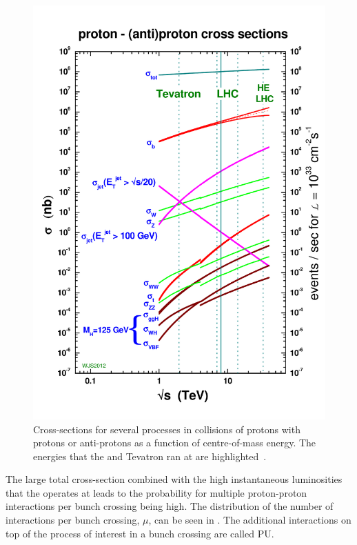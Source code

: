 \begin{figure}
  \includegraphics[width=1.2\largefigwidth]{plots/detector/crosssections2012HE_v4.pdf}
  \caption[Cross-sections for several processes in collisions of protons with protons or anti-protons as a function of centre-of-mass energy. The energies that the \LHC and Tevatron ran at are highlighted.]{Cross-sections for several processes in collisions of protons with protons or anti-protons as a function of centre-of-mass energy. The energies that the \LHC and Tevatron ran at are highlighted~\cite{Stirlingppxs}.}
  \label{fig:xssummary}
\end{figure}

The large total cross-section combined with the high instantaneous luminosities that the \LHC operates at leads to the probability for multiple proton-proton interactions per bunch crossing being high. The distribution of the number of interactions per bunch crossing, $\mu$, can be seen in . The additional interactions on top of the process of interest in a bunch crossing are called \ac{PU}.

